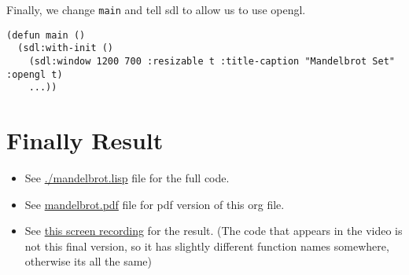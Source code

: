 \documentclass[11pt,a4paper]{article}
\begin{document}
Finally, we change \texttt{main} and tell sdl to allow us to use opengl. 
\begin{lstlisting}
(defun main ()
  (sdl:with-init ()
    (sdl:window 1200 700 :resizable t :title-caption "Mandelbrot Set" :opengl t)
    ...))
\end{lstlisting}

\section{Finally Result}
\label{sec:org3878354}

\begin{itemize}
\item See \url{./mandelbrot.lisp} file for the full code.
\item See \href{./output/mandelbrot.pdf}{mandelbrot.pdf} file for pdf version of this org file.
\item See \href{https://drive.google.com/file/d/173C0ddf5ncPkkax3NaIgMwRCXZpQoxRj/view?usp=sharing}{this screen recording} for the result. (The code that appears in the video is not this final version, so it has slightly different function names somewhere, otherwise its all the same)
\end{itemize}
\end{document}
